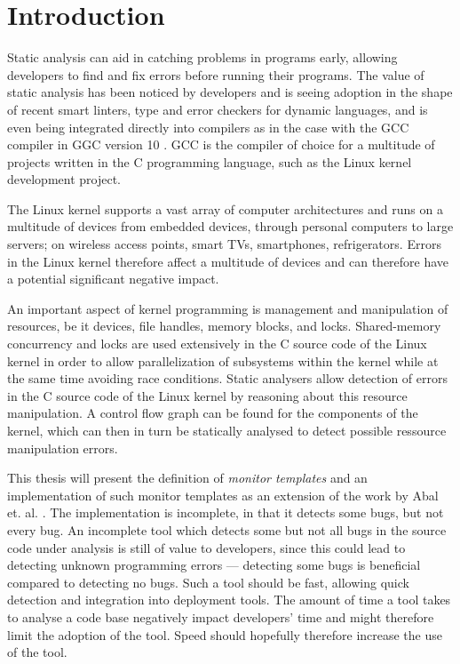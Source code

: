 \section{Introduction}

\newpar Static analysis can aid in catching problems in programs early, allowing developers to find and fix errors before running their programs. The value of static analysis has been noticed by developers and is seeing adoption in the shape of recent smart linters, type and error checkers for dynamic languages, and is even being integrated directly into compilers as in the case with the GCC compiler in GGC version 10 \cite{gcc10}. GCC is the compiler of choice for a multitude of projects written in the C programming language, such as the Linux kernel development project. 

\newpar The Linux kernel supports a vast array of computer architectures and runs on a multitude of devices from embedded devices, through personal computers to large servers; on wireless access points, smart TVs, smartphones, refrigerators. Errors in the Linux kernel therefore affect a multitude of devices and can therefore have a potential significant negative impact.

\newpar An important aspect of kernel programming is management and manipulation of resources, be it devices, file handles, memory blocks, and locks. Shared-memory concurrency and locks are used extensively in the C source code of the Linux kernel in order to allow parallelization of subsystems within the kernel while at the same time avoiding race conditions. Static analysers allow detection of errors in the C source code of the Linux kernel by reasoning about this resource manipulation. A control flow graph can be found for the components of the kernel, which can then in turn be statically analysed to detect possible ressource manipulation errors. 

\newpar This thesis will present the definition of \textit{monitor templates} and an implementation of such monitor templates as an extension of the work by Abal et. al. \cite{Abal2017EffectiveBF}. The implementation is incomplete, in that it detects some bugs, but not every bug. An incomplete tool which detects some but not all bugs in the source code under analysis is still of value to developers, since this could lead to detecting unknown programming errors --- detecting some bugs is beneficial compared to detecting no bugs. Such a tool should be fast, allowing quick detection and integration into deployment tools. The amount of time a tool takes to analyse a code base negatively impact developers' time and might therefore limit the adoption of the tool. Speed should hopefully therefore increase the use of the tool. 

